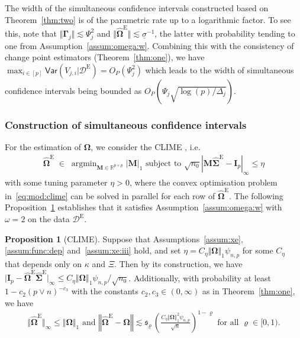 \documentclass[11pt, a4paper]{article}
\newcommand{\mbf}{\mathbf}
\newcommand{\mc}{\mathcal}
\renewcommand{\l}{\left}
\renewcommand{\r}{\right}
\def\wh{\widehat}
\newcommand{\Var}[0]{\mathsf{Var}}
\newcommand{\R}{\mathbb{R}}
\newcommand{\tE}{\text{E}}
\theoremstyle{definition}
\theoremstyle{definition}
\theoremstyle{definition}
\theoremstyle{definition}
\newtheorem{prop}[thm]{Proposition}
\theoremstyle{definition}
\theoremstyle{remark}
\theoremstyle{definition}
\theoremstyle{definition}
\theoremstyle{definition}
\begin{document}
The width of the simultaneous confidence intervals constructed based on Theorem~\ref{thm:two} is of the parametric rate up to a logarithmic factor.
To see this, note that $\Vert\bm\Gamma_j \Vert \lesssim \Psi_j^2$ and $\Vert \wh{\bm\Omega}^{\tE} \Vert \lesssim \underline{\sigma}^{-1}$, the latter with probability tending to one from Assumption~\ref{assum:omega:w}. Combining this with the consistency of change point estimators (Theorem~\ref{thm:one}), we have $\max_{i \in [p]} \Var(V_{j, i} \vert \mc D^{\tE}) = O_P(\Psi_j^2)$ which leads to the width of simultaneous confidence intervals being bounded as $O_P(\Psi_j \sqrt{\log(p)/\Delta_j})$.

\subsubsection{Construction of simultaneous confidence intervals}
\label{sec:ci}

For the estimation of $\bm\Omega$, we consider the CLIME \citep{cai2011constrained}, i.e.\
\begin{align}\label{eq:mod:clime}
\wh{\bm\Omega}^{\tE} \;\in\; \mathop{\arg\min}_{\mbf M \in \R^{p \times p}} \vert \mbf M \vert_1 
\text{ \ subject to \ } \sqrt{n_0} \l\vert \mbf M \wh{\bm\Sigma}^{\tE} - \mbf I_p \r\vert_\infty \le \eta
\end{align}
with some tuning parameter $\eta > 0$, where the convex optimisation problem in~\eqref{eq:mod:clime} can be solved in parallel for each row of $\wh{\bm\Omega}^{\tE}$.
The following Proposition~\ref{prop:clime:dataE} establishes that it satisfies Assumption~\ref{assum:omega:w} with $\omega = 2$ on the data $\mc D^{\tE}$.

\begin{prop}[CLIME]
\label{prop:clime:dataE}
Suppose that Assumptions~\ref{assum:xe}, \ref{assum:func:dep} and~\ref{assum:xe:iii} hold, and set $\eta = C_\eta \Vert \bm\Omega \Vert_1 \psi_{n, p}$ for some $C_\eta$ that depends only on $\kappa$ and $\Xi$. 
Then by its construction, we have
$\vert \mbf I_p - \wh{\bm\Omega}^{\tE} \wh{\bm\Sigma}^{\tE} \vert_\infty \le C_\eta \Vert \bm\Omega \Vert_1 \psi_{n, p}/\sqrt{n_0}$.
Additionally, with probability at least $1 - c_2 (p \vee n)^{-c_3}$ with the constants $c_2, c_3 \in (0, \infty)$ as in Theorem~\ref{thm:one}, we have
\begin{align*}
    \Vert \wh{\bm\Omega}^{\tE} \Vert_\infty \le \Vert \bm\Omega \Vert_1 \text{ \ and \ } \l\Vert \wh{\bm\Omega}^{\tE} - \bm\Omega \r\Vert \lesssim \mathfrak{s}_{\varrho}\,
		\l(\frac{C_\eta \Vert \bm\Omega \Vert_1^2 \psi_{n, p} }{\sqrt{n}}\r)^{1 - \varrho} \text{ \ for all \ } \varrho \in [0, 1).
\end{align*}
\end{prop}
\end{document}
